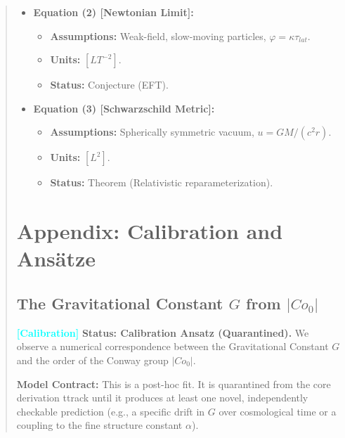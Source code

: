 \documentclass[11pt,titlepage]{article}
\newcommand{\tagcal}{\textcolor{cyan}{\textbf{[Calibration]}} }
\begin{document}
\begin{abstract}
\begin{itemize}
\begin{itemize}
\item \textbf{Status:} Theorem (within toy model).
        \end{itemize}
    
\item \textbf{Equation (2) [Newtonian Limit]:}
        \begin{itemize}
            
\item \textbf{Assumptions:} Weak-field, slow-moving particles, $\varphi = \kappa  \tau_{lat}$.
            
\item \textbf{Units:} $[L T^{-2}]$.
            
\item \textbf{Status:} Conjecture (EFT).
        \end{itemize}
    
\item \textbf{Equation (3) [Schwarzschild Metric]:}
        \begin{itemize}
            
\item \textbf{Assumptions:} Spherically symmetric vacuum, $u = GM/(c^2 r)$.
            
\item \textbf{Units:} $[L^2]$.
            
\item \textbf{Status:} Theorem (Relativistic reparameterization).
        \end{itemize}
\end{itemize}

\section{Appendix: Calibration and Ansätze}
\label{sec:calibration}

\subsection{The Gravitational Constant $G$ from $|Co_0|$}
\tagcal \textbf{Status: Calibration Ansatz (Quarantined).} 
We observe a numerical correspondence between the Gravitational Constant $G$ and the order of the Conway group $|Co_0|$. 

\textbf{Model Contract:} This is a post-hoc fit. It is quarantined from the core derivation ttrack until it produces at least one novel, independently checkable prediction (e.g., a specific drift in $G$ over cosmological time or a coupling to the fine structure constant $\alpha$).


\end{abstract}
\end{document}
